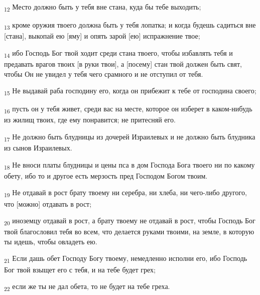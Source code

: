 \begin{tcolorbox}
\textsubscript{12} Место должно быть у тебя вне стана, куда бы тебе выходить;
\end{tcolorbox}
\begin{tcolorbox}
\textsubscript{13} кроме оружия твоего должна быть у тебя лопатка; и когда будешь садиться вне [стана], выкопай ею [яму] и опять зарой [ею] испражнение твое;
\end{tcolorbox}
\begin{tcolorbox}
\textsubscript{14} ибо Господь Бог твой ходит среди стана твоего, чтобы избавлять тебя и предавать врагов твоих [в руки твои], а [посему] стан твой должен быть свят, чтобы Он не увидел у тебя чего срамного и не отступил от тебя.
\end{tcolorbox}
\begin{tcolorbox}
\textsubscript{15} Не выдавай раба господину его, когда он прибежит к тебе от господина своего;
\end{tcolorbox}
\begin{tcolorbox}
\textsubscript{16} пусть он у тебя живет, среди вас на месте, которое он изберет в каком-нибудь из жилищ твоих, где ему понравится; не притесняй его.
\end{tcolorbox}
\begin{tcolorbox}
\textsubscript{17} Не должно быть блудницы из дочерей Израилевых и не должно быть блудника из сынов Израилевых.
\end{tcolorbox}
\begin{tcolorbox}
\textsubscript{18} Не вноси платы блудницы и цены пса в дом Господа Бога твоего ни по какому обету, ибо то и другое есть мерзость пред Господом Богом твоим.
\end{tcolorbox}
\begin{tcolorbox}
\textsubscript{19} Не отдавай в рост брату твоему ни серебра, ни хлеба, ни чего-либо другого, что [можно] отдавать в рост;
\end{tcolorbox}
\begin{tcolorbox}
\textsubscript{20} иноземцу отдавай в рост, а брату твоему не отдавай в рост, чтобы Господь Бог твой благословил тебя во всем, что делается руками твоими, на земле, в которую ты идешь, чтобы овладеть ею.
\end{tcolorbox}
\begin{tcolorbox}
\textsubscript{21} Если дашь обет Господу Богу твоему, немедленно исполни его, ибо Господь Бог твой взыщет его с тебя, и на тебе будет грех;
\end{tcolorbox}
\begin{tcolorbox}
\textsubscript{22} если же ты не дал обета, то не будет на тебе греха.
\end{tcolorbox}
